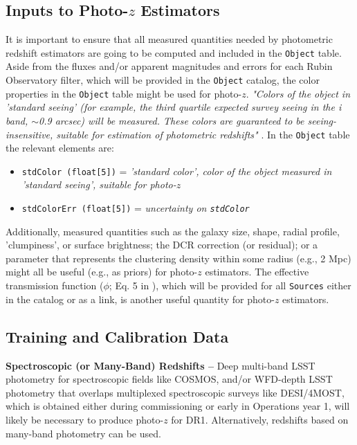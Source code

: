\documentclass[DM,authoryear,toc]{lsstdoc}
\begin{document}
\subsection{Inputs to Photo-$z$ Estimators}\label{ssec:dp_objvals}

It is important to ensure that all measured quantities needed by photometric redshift estimators are going to be computed and included in the {\tt Object} table. 
Aside from the fluxes and/or apparent magnitudes and errors for each Rubin Observatory filter, which will be provided in the {\tt Object} catalog, the color properties in the {\tt Object} table might be used for photo-$z$. {\it "Colors of the object in 'standard seeing' (for example, the third quartile expected survey seeing in the i band, $\sim$0.9 arcsec) will be measured. These colors are guaranteed to be seeing-insensitive, suitable for estimation of photometric redshifts"} . In the {\tt Object} table the relevant elements are:
\vspace{-15pt}
\begin{itemize}
\item \texttt{stdColor (float[5])} = {\it 'standard color', color of the object measured in 'standard seeing', suitable for photo-$z$}
\item \texttt{stdColorErr (float[5])} = {\it uncertainty on \texttt{stdColor}}
\end{itemize}

Additionally, measured quantities such as the galaxy size, shape, radial profile, 'clumpiness', or surface brightness; the DCR correction (or residual); or a parameter that represents the clustering density within some radius (e.g., 2 Mpc) might all be useful (e.g., as priors) for photo-$z$ estimators. The effective transmission function ($\phi$; Eq. 5 in ), which will be provided for all {\tt Sources} either in the catalog or as a link, is another useful quantity for photo-$z$ estimators.

\subsection{Training and Calibration Data}\label{ssec:dp_calib}

{\bf Spectroscopic (or Many-Band) Redshifts --}
Deep multi-band LSST photometry for spectroscopic fields like COSMOS, and/or WFD-depth LSST photometry that overlaps multiplexed spectroscopic surveys like DESI/4MOST, which is obtained either during commissioning or early in Operations year 1, will likely be necessary to produce photo-$z$ for DR1.
Alternatively, redshifts based on many-band photometry can be used.
\end{document}
